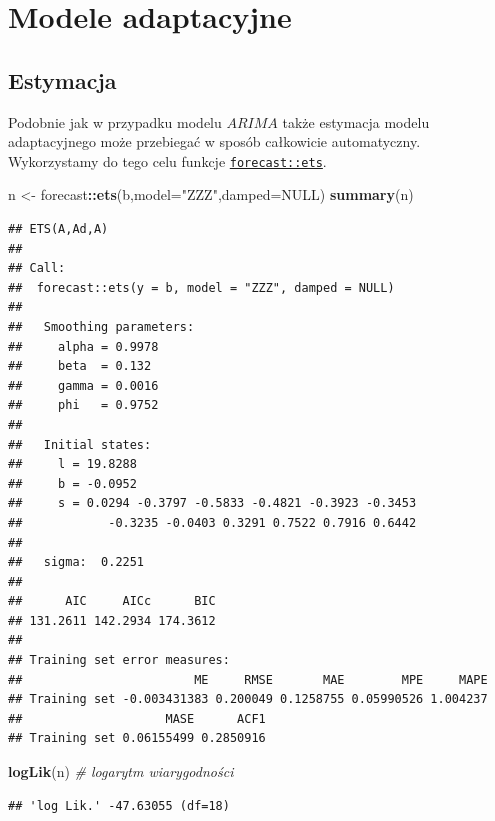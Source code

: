 \documentclass[polish,]{book}
\newenvironment{Shaded}{\begin{snugshade}}{\end{snugshade}}
\newcommand{\CommentTok}[1]{\textcolor[rgb]{0.56,0.35,0.01}{\textit{#1}}}
\newcommand{\DataTypeTok}[1]{\textcolor[rgb]{0.13,0.29,0.53}{#1}}
\newcommand{\KeywordTok}[1]{\textcolor[rgb]{0.13,0.29,0.53}{\textbf{#1}}}
\newcommand{\NormalTok}[1]{#1}
\newcommand{\OperatorTok}[1]{\textcolor[rgb]{0.81,0.36,0.00}{\textbf{#1}}}
\newcommand{\OtherTok}[1]{\textcolor[rgb]{0.56,0.35,0.01}{#1}}
\newcommand{\StringTok}[1]{\textcolor[rgb]{0.31,0.60,0.02}{#1}}
\begin{document}
\hypertarget{part_74}{%
\section{Modele adaptacyjne}\label{part_74}}

\hypertarget{part_741}{%
\subsection{Estymacja}\label{part_741}}

Podobnie jak w przypadku modelu \(ARIMA\) także estymacja modelu adaptacyjnego
może przebiegać w sposób całkowicie automatyczny. Wykorzystamy do tego celu
funkcje \href{https://rdrr.io/cran/forecast/man/ets.html}{\texttt{forecast::ets}}.

\begin{Shaded}
\begin{Highlighting}[]
\NormalTok{n <-}\StringTok{ }\NormalTok{forecast}\OperatorTok{::}\KeywordTok{ets}\NormalTok{(b,}\DataTypeTok{model=}\StringTok{"ZZZ"}\NormalTok{,}\DataTypeTok{damped=}\OtherTok{NULL}\NormalTok{)}
\KeywordTok{summary}\NormalTok{(n)}
\end{Highlighting}
\end{Shaded}

\begin{verbatim}
## ETS(A,Ad,A) 
## 
## Call:
##  forecast::ets(y = b, model = "ZZZ", damped = NULL) 
## 
##   Smoothing parameters:
##     alpha = 0.9978 
##     beta  = 0.132 
##     gamma = 0.0016 
##     phi   = 0.9752 
## 
##   Initial states:
##     l = 19.8288 
##     b = -0.0952 
##     s = 0.0294 -0.3797 -0.5833 -0.4821 -0.3923 -0.3453
##            -0.3235 -0.0403 0.3291 0.7522 0.7916 0.6442
## 
##   sigma:  0.2251
## 
##      AIC     AICc      BIC 
## 131.2611 142.2934 174.3612 
## 
## Training set error measures:
##                        ME     RMSE       MAE        MPE     MAPE
## Training set -0.003431383 0.200049 0.1258755 0.05990526 1.004237
##                    MASE      ACF1
## Training set 0.06155499 0.2850916
\end{verbatim}

\begin{Shaded}
\begin{Highlighting}[]
\KeywordTok{logLik}\NormalTok{(n) }\CommentTok{# logarytm wiarygodności}
\end{Highlighting}
\end{Shaded}

\begin{verbatim}
## 'log Lik.' -47.63055 (df=18)
\end{verbatim}
\end{document}
